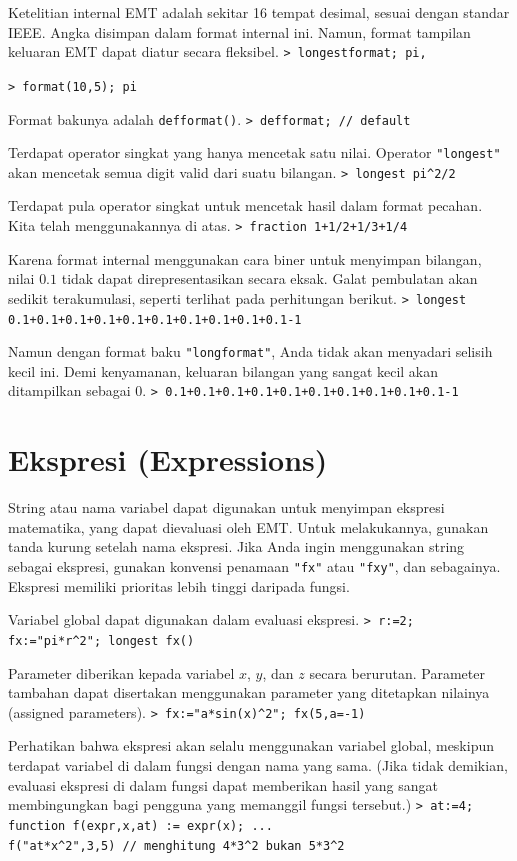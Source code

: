 \documentclass[11pt, a4paper]{article}
\newcommand{\emtcmd}[1]{\noindent\texttt{\textcolor{emtcommand}{>}\ #1}\par\smallskip}
\begin{document}
Ketelitian internal EMT adalah sekitar 16 tempat desimal, sesuai dengan standar IEEE. Angka disimpan dalam format internal ini. Namun, format tampilan keluaran EMT dapat diatur secara fleksibel.
\emtcmd{longestformat; pi,}
\emtcmd{format(10,5); pi}

Format bakunya adalah \texttt{defformat()}.
\emtcmd{defformat; \textcolor{emtcomment}{// default}}

Terdapat operator singkat yang hanya mencetak satu nilai. Operator \texttt{"longest"} akan mencetak semua digit valid dari suatu bilangan.
\emtcmd{longest pi\^{}2/2}

Terdapat pula operator singkat untuk mencetak hasil dalam format pecahan. Kita telah menggunakannya di atas.
\emtcmd{fraction 1+1/2+1/3+1/4}

Karena format internal menggunakan cara biner untuk menyimpan bilangan, nilai $0.1$ tidak dapat direpresentasikan secara eksak. Galat pembulatan akan sedikit terakumulasi, seperti terlihat pada perhitungan berikut.
\emtcmd{longest 0.1+0.1+0.1+0.1+0.1+0.1+0.1+0.1+0.1+0.1-1}

Namun dengan format baku \texttt{"longformat"}, Anda tidak akan menyadari selisih kecil ini. Demi kenyamanan, keluaran bilangan yang sangat kecil akan ditampilkan sebagai 0.
\emtcmd{0.1+0.1+0.1+0.1+0.1+0.1+0.1+0.1+0.1+0.1-1}

\section*{Ekspresi (Expressions)}

String atau nama variabel dapat digunakan untuk menyimpan ekspresi matematika, yang dapat dievaluasi oleh EMT. Untuk melakukannya, gunakan tanda kurung setelah nama ekspresi. Jika Anda ingin menggunakan string sebagai ekspresi, gunakan konvensi penamaan \texttt{"fx"} atau \texttt{"fxy"}, dan sebagainya. Ekspresi memiliki prioritas lebih tinggi daripada fungsi.

Variabel global dapat digunakan dalam evaluasi ekspresi.
\emtcmd{r:=2; fx:="pi*r\^{}2"; longest fx()}

Parameter diberikan kepada variabel $x$, $y$, dan $z$ secara berurutan. Parameter tambahan dapat disertakan menggunakan parameter yang ditetapkan nilainya (assigned parameters).
\emtcmd{fx:="a*sin(x)\^{}2"; fx(5,a=-1)}

Perhatikan bahwa ekspresi akan selalu menggunakan variabel global, meskipun terdapat variabel di dalam fungsi dengan nama yang sama. (Jika tidak demikian, evaluasi ekspresi di dalam fungsi dapat memberikan hasil yang sangat membingungkan bagi pengguna yang memanggil fungsi tersebut.)
\emtcmd{at:=4; function f(expr,x,at) := expr(x); ... \\
\hspace*{1em} f("at*x\^{}2",3,5) \textcolor{emtcomment}{// menghitung 4*3\^{}2 bukan 5*3\^{}2}}
\end{document}
